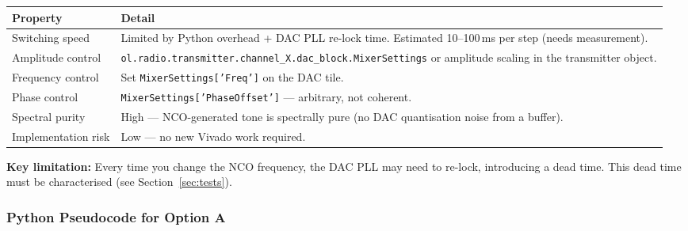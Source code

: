 \documentclass[11pt,a4paper]{article}
\begin{document}
\begin{center}
\begin{tabular}{L{3.5cm} L{9.5cm}}
\toprule
\textbf{Property} & \textbf{Detail} \\
\midrule
Switching speed    & Limited by Python overhead + DAC PLL re-lock time.
                     Estimated 10--100\,ms per step (needs measurement). \\
Amplitude control  & \texttt{ol.radio.transmitter.channel\_X.dac\_block.MixerSettings}
                     or amplitude scaling in the transmitter object. \\
Frequency control  & Set \texttt{MixerSettings['Freq']} on the DAC tile. \\
Phase control      & \texttt{MixerSettings['PhaseOffset']} --- arbitrary, not coherent. \\
Spectral purity    & High --- NCO-generated tone is spectrally pure (no DAC quantisation
                     noise from a buffer). \\
Implementation risk & Low --- no new Vivado work required. \\
\bottomrule
\end{tabular}
\end{center}

\textbf{Key limitation:} Every time you change the NCO frequency, the DAC PLL may
need to re-lock, introducing a dead time. This dead time must be characterised
(see Section~\ref{sec:tests}).

\subsubsection{Python Pseudocode for Option A}
\end{document}
